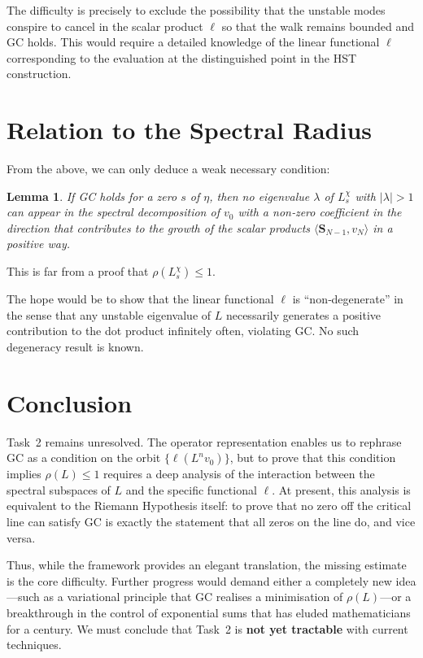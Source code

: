 \documentclass[11pt,a4paper]{article}
\newtheorem{lemma}[theorem]{Lemma}
\begin{document}
The difficulty is precisely to exclude the possibility that the unstable modes conspire to cancel in the scalar product $\ell$ so that the walk remains bounded and GC holds.  This would require a detailed knowledge of the linear functional $\ell$ corresponding to the evaluation at the distinguished point in the HST construction.

\section{Relation to the Spectral Radius}
From the above, we can only deduce a weak necessary condition:
\begin{lemma}\label{lem:rho2}
If GC holds for a zero $s$ of $\eta$, then no eigenvalue $\lambda$ of $L_s^{\chi}$ with $|\lambda| > 1$ can appear in the spectral decomposition of $v_0$ with a non‑zero coefficient in the direction that contributes to the growth of the scalar products $\langle \mathbf{S}_{N-1}, v_N\rangle$ in a positive way.
\end{lemma}
This is far from a proof that $\rho(L_s^{\chi}) \le 1$.

The hope would be to show that the linear functional $\ell$ is ``non‑degenerate'' in the sense that any unstable eigenvalue of $L$ necessarily generates a positive contribution to the dot product infinitely often, violating GC.  No such degeneracy result is known.

\section{Conclusion}
Task~2 remains unresolved.  The operator representation enables us to rephrase GC as a condition on the orbit $\{ \ell(L^n v_0) \}$, but to prove that this condition implies $\rho(L) \le 1$ requires a deep analysis of the interaction between the spectral subspaces of $L$ and the specific functional $\ell$.  At present, this analysis is equivalent to the Riemann Hypothesis itself: to prove that no zero off the critical line can satisfy GC is exactly the statement that all zeros on the line do, and vice versa.

Thus, while the framework provides an elegant translation, the missing estimate is the core difficulty.  Further progress would demand either a completely new idea—such as a variational principle that GC realises a minimisation of $\rho(L)$—or a breakthrough in the control of exponential sums that has eluded mathematicians for a century.  We must conclude that Task~2 is \textbf{not yet tractable} with current techniques.
\end{document}
